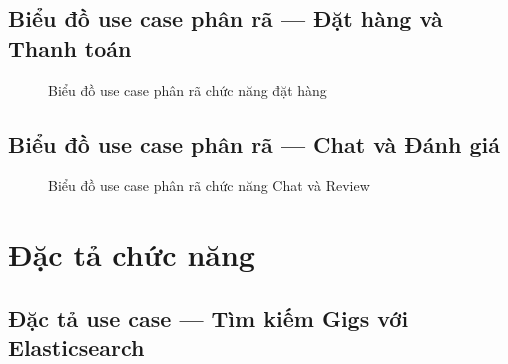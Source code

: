 \documentclass[12pt]{extreport}
\begin{document}
\subsection{Biểu đồ use case phân rã --- Đặt hàng và Thanh toán}

\begin{figure}[H]
    \centering
    \caption{Biểu đồ use case phân rã chức năng đặt hàng}
    \label{fig:uc_order}
\end{figure}

\subsection{Biểu đồ use case phân rã --- Chat và Đánh giá}

\begin{figure}[H]
    \centering
    \caption{Biểu đồ use case phân rã chức năng Chat và Review}
    \label{fig:uc_chat_review}
\end{figure}

\section{Đặc tả chức năng}

\subsection{Đặc tả use case --- Tìm kiếm Gigs với Elasticsearch}
\end{document}
